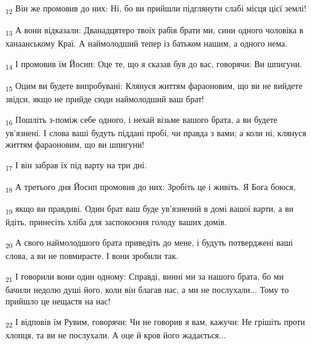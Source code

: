 \begin{tcolorbox}
\textsubscript{12} Він же промовив до них: Ні, бо ви прийшли підглянути слабі місця цієї землі!
\end{tcolorbox}
\begin{tcolorbox}
\textsubscript{13} А вони відказали: Дванадцятеро твоїх рабів брати ми, сини одного чоловіка в ханаанському Краї. А наймолодший тепер із батьком нашим, а одного нема.
\end{tcolorbox}
\begin{tcolorbox}
\textsubscript{14} І промовив їм Йосип: Оце те, що я сказав був до вас, говорячи: Ви шпигуни.
\end{tcolorbox}
\begin{tcolorbox}
\textsubscript{15} Оцим ви будете випробувані: Клянуся життям фараоновим, що ви не вийдете звідси, якщо не прийде сюди наймолодший ваш брат!
\end{tcolorbox}
\begin{tcolorbox}
\textsubscript{16} Пошліть з-поміж себе одного, і нехай візьме вашого брата, а ви будете ув'язнені. І слова ваші будуть піддані пробі, чи правда з вами; а коли ні, клянуся життям фараоновим, що ви шпигуни!
\end{tcolorbox}
\begin{tcolorbox}
\textsubscript{17} І він забрав їх під варту на три дні.
\end{tcolorbox}
\begin{tcolorbox}
\textsubscript{18} А третього дня Йосип промовив до них: Зробіть це і живіть. Я Бога боюся,
\end{tcolorbox}
\begin{tcolorbox}
\textsubscript{19} якщо ви правдиві. Один брат ваш буде ув'язнений в домі вашої варти, а ви йдіть, принесіть хліба для заспокоєння голоду ваших домів.
\end{tcolorbox}
\begin{tcolorbox}
\textsubscript{20} А свого наймолодшого брата приведіть до мене, і будуть потверджені ваші слова, а ви не повмираєте. І вони зробили так.
\end{tcolorbox}
\begin{tcolorbox}
\textsubscript{21} І говорили вони один одному: Справді, винні ми за нашого брата, бо ми бачили недолю душі його, коли він благав нас, а ми не послухали... Тому то прийшло це нещастя на нас!
\end{tcolorbox}
\begin{tcolorbox}
\textsubscript{22} І відповів їм Рувим, говорячи: Чи не говорив я вам, кажучи: Не грішіть проти хлопця, та ви не послухали. А оце й кров його жадається...
\end{tcolorbox}

